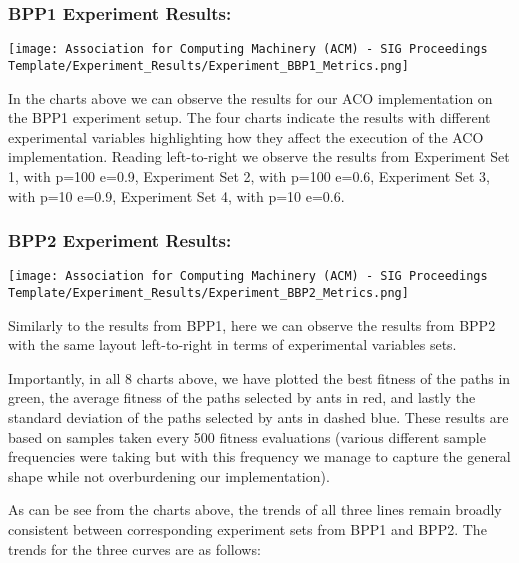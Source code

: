 \documentclass[sigconf]{acmart}
\begin{document}
            \subsubsection{BPP1 Experiment Results:\newline}
                \texttt{[image: Association for Computing Machinery (ACM) - SIG Proceedings Template/Experiment\_Results/Experiment\_BBP1\_Metrics.png]}

            In the charts above we can observe the results for our ACO implementation on the BPP1 experiment setup. The four charts indicate the results with different experimental variables highlighting how they affect the execution of the ACO implementation. Reading left-to-right we observe the results from Experiment Set 1, with p=100 e=0.9, Experiment Set 2, with p=100 e=0.6, Experiment Set 3, with p=10 e=0.9, Experiment Set 4, with p=10 e=0.6.

            \subsubsection{BPP2 Experiment Results:\newline}
                \texttt{[image: Association for Computing Machinery (ACM) - SIG Proceedings Template/Experiment\_Results/Experiment\_BBP2\_Metrics.png]}

            Similarly to the results from BPP1, here we can observe the results from BPP2 with the same layout left-to-right in terms of experimental variables sets.\newline

            Importantly, in all 8 charts above, we have plotted the best fitness of the paths in green, the average fitness of the paths selected by ants in red, and lastly the standard deviation of the paths selected by ants in dashed blue. These results are based on samples taken every 500 fitness evaluations (various different sample frequencies were taking but with this frequency we manage to capture the general shape while not overburdening our implementation).\newline

            As can be see from the charts above, the trends of all three lines remain broadly consistent between corresponding experiment sets from BPP1 and BPP2. The trends for the three curves are as follows:
\end{document}
